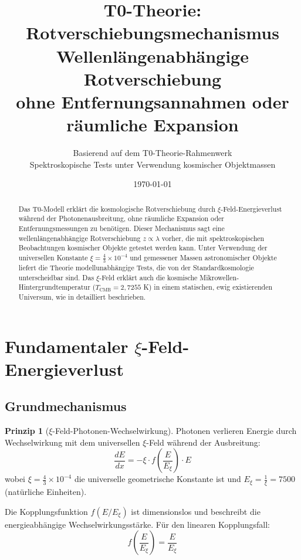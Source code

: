 \documentclass[12pt,a4paper]{article}
\title{\Huge\textbf{T0-Theorie: Rotverschiebungsmechanismus}\\
	\Large Wellenl\"angenabh\"angige Rotverschiebung \\
	ohne Entfernungsannahmen oder r\"aumliche Expansion}
\author{Basierend auf dem T0-Theorie-Rahmenwerk\\
	Spektroskopische Tests unter Verwendung kosmischer Objektmassen}
\date{\today}
\newcommand{\xiconst}{\xi = \frac{4}{3} \times 10^{-4}}
\newcommand{\Exi}{E_\xi}
\theoremstyle{definition}
\newtheorem{principle}{Prinzip}
\begin{document}
	
	\maketitle
	
	\begin{abstract}
		Das T0-Modell erkl\"art die kosmologische Rotverschiebung durch $\xi$-Feld-Energieverlust w\"ahrend der Photonenausbreitung, ohne r\"aumliche Expansion oder Entfernungsmessungen zu ben\"otigen. Dieser Mechanismus sagt eine wellenl\"angenabh\"angige Rotverschiebung $z \propto \lambda$ vorher, die mit spektroskopischen Beobachtungen kosmischer Objekte getestet werden kann. Unter Verwendung der universellen Konstante $\xiconst$ und gemessener Massen astronomischer Objekte liefert die Theorie modellunabh\"angige Tests, die von der Standardkosmologie unterscheidbar sind. Das $\xi$-Feld erkl\"art auch die kosmische Mikrowellen-Hintergrundtemperatur ($T_{\text{CMB}} = 2,7255$ K) in einem statischen, ewig existierenden Universum, wie in \cite{pascher2025} detailliert beschrieben.
	\end{abstract}
	
	\tableofcontents
	\newpage
	
	\section{Fundamentaler $\xi$-Feld-Energieverlust}
	\label{sec:xi_field}
	
	\subsection{Grundmechanismus}
	
	\begin{principle}[$\xi$-Feld-Photonen-Wechselwirkung]
		Photonen verlieren Energie durch Wechselwirkung mit dem universellen $\xi$-Feld w\"ahrend der Ausbreitung:
		\begin{equation}
			\frac{dE}{dx} = -\xi \cdot f\left(\frac{E}{\Exi}\right) \cdot E
		\end{equation}
		wobei $\xiconst$ die universelle geometrische Konstante ist und $\Exi = \frac{1}{\xi} = 7500$ (nat\"urliche Einheiten).
	\end{principle}
	
	Die Kopplungsfunktion $f(E/\Exi)$ ist dimensionslos und beschreibt die energieabh\"angige Wechselwirkungsst\"arke. F\"ur den linearen Kopplungsfall:
	\begin{equation}
		f\left(\frac{E}{\Exi}\right) = \frac{E}{\Exi}
	\end{equation}
	
\end{document}

